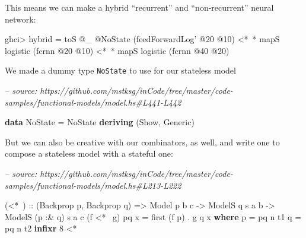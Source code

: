 \documentclass[]{article}
\newenvironment{Shaded}{}{}
\newcommand{\CommentTok}[1]{\textcolor[rgb]{0.38,0.63,0.69}{\textit{#1}}}
\newcommand{\DataTypeTok}[1]{\textcolor[rgb]{0.56,0.13,0.00}{#1}}
\newcommand{\DecValTok}[1]{\textcolor[rgb]{0.25,0.63,0.44}{#1}}
\newcommand{\FunctionTok}[1]{\textcolor[rgb]{0.02,0.16,0.49}{#1}}
\newcommand{\KeywordTok}[1]{\textcolor[rgb]{0.00,0.44,0.13}{\textbf{#1}}}
\newcommand{\NormalTok}[1]{#1}
\newcommand{\OtherTok}[1]{\textcolor[rgb]{0.00,0.44,0.13}{#1}}
\begin{document}
This means we can make a hybrid ``recurrent'' and ``non-recurrent'' neural
network:

\begin{Shaded}
\begin{Highlighting}[]
\NormalTok{ghci}\FunctionTok{>}\NormalTok{ hybrid }\FunctionTok{=}\NormalTok{ toS }\FunctionTok{@}\NormalTok{_ }\FunctionTok{@}\DataTypeTok{NoState}\NormalTok{ (feedForwardLog' }\FunctionTok{@}\DecValTok{20} \FunctionTok{@}\DecValTok{10}\NormalTok{)}
          \FunctionTok{<*~*}\NormalTok{ mapS logistic (fcrnn }\FunctionTok{@}\DecValTok{20} \FunctionTok{@}\DecValTok{10}\NormalTok{)}
          \FunctionTok{<*~*}\NormalTok{ mapS logistic (fcrnn }\FunctionTok{@}\DecValTok{40} \FunctionTok{@}\DecValTok{20}\NormalTok{)}
\end{Highlighting}
\end{Shaded}

We made a dummy type \texttt{NoState} to use for our stateless model

\begin{Shaded}
\begin{Highlighting}[]
\CommentTok{-- source: https://github.com/mstksg/inCode/tree/master/code-samples/functional-models/model.hs#L441-L442}

\KeywordTok{data} \DataTypeTok{NoState} \FunctionTok{=} \DataTypeTok{NoState}
  \KeywordTok{deriving}\NormalTok{ (}\DataTypeTok{Show}\NormalTok{, }\DataTypeTok{Generic}\NormalTok{)}
\end{Highlighting}
\end{Shaded}

But we can also be creative with our combinators, as well, and write one to
compose a stateless model with a stateful one:

\begin{Shaded}
\begin{Highlighting}[]
\CommentTok{-- source: https://github.com/mstksg/inCode/tree/master/code-samples/functional-models/model.hs#L213-L222}

\NormalTok{(}\FunctionTok{<*~}\NormalTok{)}
\OtherTok{  ::}\NormalTok{ (}\DataTypeTok{Backprop}\NormalTok{ p, }\DataTypeTok{Backprop}\NormalTok{ q)}
    \OtherTok{=>} \DataTypeTok{Model}\NormalTok{   p         b c}
    \OtherTok{->} \DataTypeTok{ModelS}\NormalTok{       q  s a b}
    \OtherTok{->} \DataTypeTok{ModelS}\NormalTok{ (p }\FunctionTok{:&}\NormalTok{ q) s a c}
\NormalTok{(f }\FunctionTok{<*~}\NormalTok{ g) pq x }\FunctionTok{=}\NormalTok{ first (f p) }\FunctionTok{.}\NormalTok{ g q x}
  \KeywordTok{where}
\NormalTok{    p }\FunctionTok{=}\NormalTok{ pq }\FunctionTok{^^.}\NormalTok{ t1}
\NormalTok{    q }\FunctionTok{=}\NormalTok{ pq }\FunctionTok{^^.}\NormalTok{ t2}
\KeywordTok{infixr} \DecValTok{8} \FunctionTok{<*~}
\end{Highlighting}
\end{Shaded}
\end{document}
